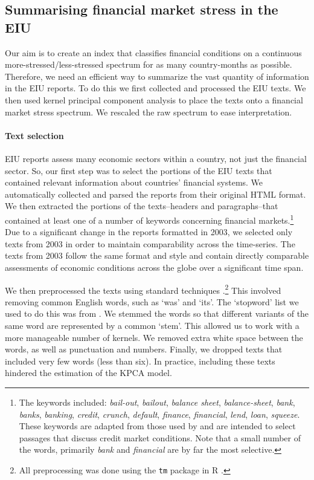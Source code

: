 \documentclass[]{article}
\begin{document}
\subsection{Summarising financial market stress in the
EIU}\label{summarizing-financial-market-stress-in-the-eiu}

Our aim is to create an index that classifies financial conditions on a continuous more-stressed/less-stressed spectrum for as many country-months as possible. Therefore, we need an efficient way to summarize the vast quantity of information in the EIU reports. To do this we first collected and processed the EIU texts. We then used kernel principal component analysis to place the texts onto a financial market stress spectrum. We rescaled the raw spectrum to ease interpretation.

\paragraph{Text selection}\label{text-selection}

EIU reports assess many economic sectors within a country,
not just the financial sector. So, our first step was to select the portions of the EIU texts that contained relevant information about countries' financial systems. We automatically collected and parsed the reports from their original HTML format. We then extracted the portions of the texts--headers and paragraphs--that contained at least one of a number of keywords concerning financial markets.\footnote{The
  keywords included: \emph{bail-out}, \emph{bailout}, \emph{balance
  sheet}, \emph{balance-sheet}, \emph{bank}, \emph{banks},
  \emph{banking}, \emph{credit}, \emph{crunch}, \emph{default},
  \emph{finance}, \emph{financial}, \emph{lend}, \emph{loan},
  \emph{squeeze}. These keywords are adapted
  from those used by \cite{Romer2015} and are intended to
  select passages that discuss credit market conditions. Note that a small number of the words, primarily \emph{bank} and \emph{financial} are by far the most selective.} Due to a significant change in the reports formatted in 2003, we
selected only texts from 2003 in order to maintain comparability across the time-series. The texts from 2003 follow the same format and style and contain directly comparable assessments of economic conditions across the globe over a significant time span.

We then preprocessed the texts using standard techniques \citep[see][]{Grimmer2013}.\footnote{All preprocessing was done using the \texttt{tm} package \citep{tm2015} in R \citep{R-cite}.} This involved removing common English words, such as `was' and `its'. The `stopword' list we used to do this was from \cite{dhillon:modha:mlj01}. We stemmed the words so that different variants of the same word are represented by a common `stem'. This allowed us to work with a more manageable number of kernels. We removed extra white space between the words, as well as punctuation and numbers. Finally, we dropped texts that included very few words (less than six). In practice, including these texts hindered the estimation of the KPCA model.
\end{document}
